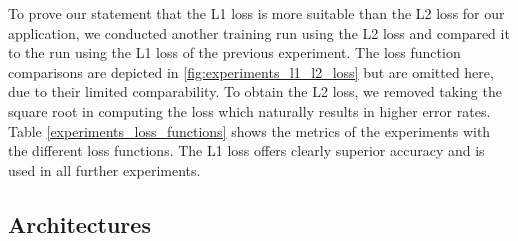 To prove our statement that the L1 loss is more suitable than the L2 loss for our application, we conducted another training run using the L2 loss and compared it to the run using the L1 loss of the previous experiment. The loss function comparisons are depicted in \ref{fig:experiments_l1_l2_loss} but are omitted here, due to their limited comparability. To obtain the L2 loss, we removed taking the square root in computing the loss which naturally results in higher error rates. Table \ref{experiments_loss_functions} shows the metrics of the experiments with the different loss functions. The L1 loss offers clearly superior accuracy and is used in all further experiments.

\subsection{Architectures} \label{subsection:architectures}


